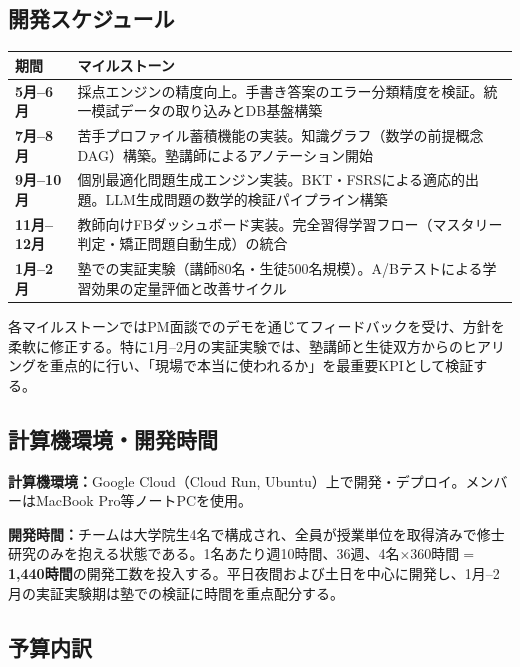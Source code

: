 \documentclass[paper=a4,fontsize=10.5bp,jafontsize=10.5bp,twocolumn]{jlreq}
\begin{document}
\subsection{開発スケジュール}

\begin{footnotesize}\noindent
\begin{tabularx}{\linewidth}{>{\bfseries}l X}
\toprule
期間 & マイルストーン \\
\midrule
5月--6月 & 採点エンジンの精度向上。手書き答案のエラー分類精度を検証。統一模試データの取り込みとDB基盤構築 \\
7月--8月 & 苦手プロファイル蓄積機能の実装。知識グラフ（数学の前提概念DAG）構築。塾講師によるアノテーション開始 \\
9月--10月 & 個別最適化問題生成エンジン実装。BKT・FSRSによる適応的出題。LLM生成問題の数学的検証パイプライン構築 \\
11月--12月 & 教師向けFBダッシュボード実装。完全習得学習フロー（マスタリー判定・矯正問題自動生成）の統合 \\
1月--2月 & 塾での実証実験（講師80名・生徒500名規模）。A/Bテストによる学習効果の定量評価と改善サイクル \\
\bottomrule
\end{tabularx}
\end{footnotesize}


\noindent
各マイルストーンではPM面談でのデモを通じてフィードバックを受け、方針を柔軟に修正する。特に1月--2月の実証実験では、塾講師と生徒双方からのヒアリングを重点的に行い、「現場で本当に使われるか」を最重要KPIとして検証する。

\subsection{計算機環境・開発時間}

\noindent\textbf{計算機環境：}Google Cloud（Cloud Run, Ubuntu）上で開発・デプロイ。メンバーはMacBook Pro等ノートPCを使用。

\noindent\textbf{開発時間：}チームは大学院生4名で構成され、全員が授業単位を取得済みで修士研究のみを抱える状態である。1名あたり週10時間、36週、4名$\times$360時間$=$\textbf{1,440時間}の開発工数を投入する。平日夜間および土日を中心に開発し、1月--2月の実証実験期は塾での検証に時間を重点配分する。

\subsection{予算内訳}
\end{document}
